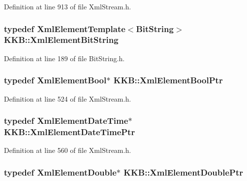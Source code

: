 Definition at line 913 of file Xml\+Stream.\+h.

\subsubsection[{\texorpdfstring{Xml\+Element\+Bit\+String}{XmlElementBitString}}]{\setlength{\rightskip}{0pt plus 5cm}typedef {\bf Xml\+Element\+Template}$<${\bf Bit\+String}$>$ {\bf K\+K\+B\+::\+Xml\+Element\+Bit\+String}}\hypertarget{namespace_k_k_b_a08eccbf7626d1c9bc414dce125921ce1}{}\label{namespace_k_k_b_a08eccbf7626d1c9bc414dce125921ce1}


Definition at line 189 of file Bit\+String.\+h.

\subsubsection[{\texorpdfstring{Xml\+Element\+Bool\+Ptr}{XmlElementBoolPtr}}]{\setlength{\rightskip}{0pt plus 5cm}typedef {\bf Xml\+Element\+Bool}$\ast$ {\bf K\+K\+B\+::\+Xml\+Element\+Bool\+Ptr}}\hypertarget{namespace_k_k_b_af1a286924b8cff973d8b7d3d733a0a06}{}\label{namespace_k_k_b_af1a286924b8cff973d8b7d3d733a0a06}


Definition at line 524 of file Xml\+Stream.\+h.

\subsubsection[{\texorpdfstring{Xml\+Element\+Date\+Time\+Ptr}{XmlElementDateTimePtr}}]{\setlength{\rightskip}{0pt plus 5cm}typedef {\bf Xml\+Element\+Date\+Time}$\ast$ {\bf K\+K\+B\+::\+Xml\+Element\+Date\+Time\+Ptr}}\hypertarget{namespace_k_k_b_a60ee0bdbdc0be7118d94a0c84d156440}{}\label{namespace_k_k_b_a60ee0bdbdc0be7118d94a0c84d156440}


Definition at line 560 of file Xml\+Stream.\+h.

\subsubsection[{\texorpdfstring{Xml\+Element\+Double\+Ptr}{XmlElementDoublePtr}}]{\setlength{\rightskip}{0pt plus 5cm}typedef {\bf Xml\+Element\+Double}$\ast$ {\bf K\+K\+B\+::\+Xml\+Element\+Double\+Ptr}}\hypertarget{namespace_k_k_b_a2b0fe9de3a44a3ec2fcaa779cb1b728f}{}\label{namespace_k_k_b_a2b0fe9de3a44a3ec2fcaa779cb1b728f}


